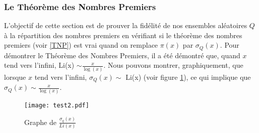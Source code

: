 \documentclass[../main.tex]{report}
\begin{document}
\subsubsection{Le Théorème des Nombres Premiers}

L'objectif de cette section est de prouver la fidélité de nos ensembles aléatoires $Q$ à la répartition des nombres premiers en vérifiant si le théorème des nombres premiers (voir \ref{TNP}) est vrai quand on remplace $\pi(x)$ par $\sigma_{Q}(x)$. 
Pour démontrer le Théorème des Nombres Premiers, il a été démontré que, quand $x$ tend vers l'infini, Li(x) $ \sim \frac{x}{\log(x)} $. Nous pouvons montrer, graphiquement, que lorsque $x$ tend vers l'infini, $ \sigma_{Q}(x) \sim $ Li(x)  (voir figure \ref{im:image3}), ce qui implique que $ \sigma_{Q}(x) \sim \frac{x}{\log(x)} $.

\begin{figure}[H]
 \centering
 \texttt{[image: test2.pdf]}
 \caption{Graphe de $\frac{\sigma_{q}(x)}{Li(x)}$}
 \label{im:image3}
 \end{figure}
\end{document}
